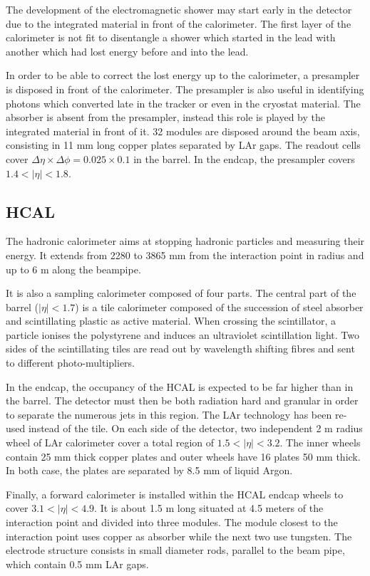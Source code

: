 The development of the electromagnetic shower may start early in the detector due to the integrated material in front of the calorimeter.
The first layer of the calorimeter is not fit to disentangle a shower which started in the lead with another which had lost energy before and into the lead.

In order to be able to correct the lost energy up to the calorimeter, a presampler is disposed in front of the calorimeter.
The presampler is also useful in identifying photons which converted late in the tracker or even in the cryostat material.
The absorber is absent from the presampler, instead this role is played by the integrated material in front of it.
32 modules are disposed around the beam axis, consisting in 11 mm long copper plates separated by LAr gaps.
The readout cells cover \(\Delta\eta\times\Delta\phi=0.025\times0.1\) in the barrel.
In the endcap, the presampler covers $1.4<|\eta|<1.8$.

\subsection{HCAL}
\label{sec:orgeacc015}

The hadronic calorimeter aims at stopping hadronic particles and measuring their energy.
It extends from 2280 to 3865 mm from the interaction point in radius and up to 6 m along the beampipe.

It is also a sampling calorimeter composed of four parts.
The central part of the barrel ($|\eta|<1.7$) is a tile calorimeter composed of the succession of steel absorber and scintillating plastic as active material.
When crossing the scintillator, a particle  ionises the polystyrene and induces an ultraviolet scintillation light.
Two sides of the scintillating tiles are read out by wavelength shifting fibres and sent to different photo-multipliers.

In the endcap, the occupancy of the HCAL is expected to be far higher than in the barrel.
The detector must then be both radiation hard and granular in order to separate the numerous jets in this region.
The LAr technology has been re-used instead of the tile.
On each side of the detector, two independent 2 m radius wheel of LAr calorimeter cover a total region of $1.5<|\eta|<3.2$.
The inner wheels contain 25 mm thick copper plates and outer wheels have 16 plates 50 mm thick.
In both case, the plates are separated by 8.5 mm of liquid Argon.

Finally, a forward calorimeter is installed within the HCAL endcap wheels to cover $3.1<|\eta|<4.9$.
It is about 1.5 m long situated at 4.5 meters of the interaction point and divided into three modules.
The module closest to the interaction point uses copper as absorber while the next two use tungsten.
The electrode structure consists in small diameter rods, parallel to the beam pipe, which contain 0.5 mm LAr gaps.

